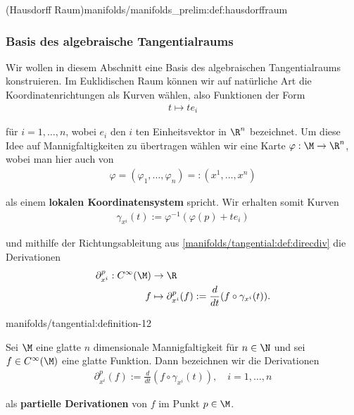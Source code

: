 \documentclass[letterpaper,10pt,english]{jupyterBook}
\begin{document}
\begin{definition}{(Hausdorff Raum)}{manifolds/manifolds_prelim:def:hausdorffraum}
\subsubsection{Basis des algebraische Tangentialraums}
\label{\detokenize{manifolds/tangential:basis-des-algebraische-tangentialraums}}\label{\detokenize{manifolds/tangential:sec-tpbasis}}
\par
Wir wollen in diesem Abschnitt eine Basis des algebraischen Tangentialraums konstruieren.
Im Euklidischen Raum können wir auf natürliche Art die Koordinatenrichtungen als Kurven wählen, also Funktionen der Form
\begin{align*}
t \mapsto t e_i
\end{align*}
\par
für \(i=1,\ldots,n\), wobei \(e_i\) den \(i\) ten Einheitsvektor in \(\R^n\) bezeichnet.
Um diese Idee auf Mannigfaltigkeiten zu übertragen wählen wir eine Karte \(\varphi:\M\to\R^n\), wobei man hier auch von
\begin{align*}
\varphi = (\varphi_1,\ldots,\varphi_n) =: (x^1,\ldots,x^n)
\end{align*}
\par
als einem \textbf{lokalen Koordinatensystem} spricht.
Wir erhalten somit Kurven
\begin{align*}
\gamma_{x^i}(t):= \varphi^{-1}(\varphi(p) + t e_i)
\end{align*}
\par
und mithilfe der Richtungsableitung aus \cref{manifolds/tangential:def:direcdiv} die Derivationen
\begin{align*}
\partial_{x^i}^p: C^\infty(\M) &\to \R\\
f &\mapsto \partial_{x^i}^p(f) := \frac{d}{dt} (f\circ \gamma_{x^i}(t)).
\end{align*}\begin{definition}{}{manifolds/tangential:definition-12}



\par
Sei \(\M\) eine glatte \(n\) dimensionale Mannigfaltigkeit für \(n\in\N\) und sei \(f \in C^\infty(\M)\) eine glatte Funktion.
Dann bezeichnen wir die Derivationen
\begin{align*}
\partial_{x^i}^p (f) := \frac{d}{dt} (f\circ \gamma_{x^i}(t)), \quad i=1,\ldots,n
\end{align*}
\par
als \textbf{partielle Derivationen} von \(f\) im Punkt \(p \in \M\).
\end{definition}


\end{definition}
\end{document}
